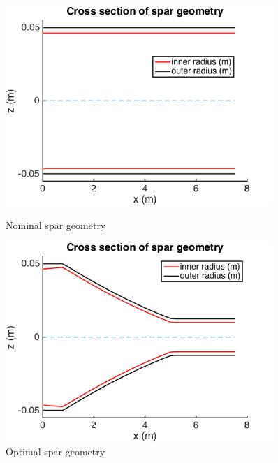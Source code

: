 \documentclass[11pt]{article}
\begin{document}
\begin{figure}[hbt]
\centering
\begin{minipage}[b]{0.4\textwidth}
\includegraphics[width=0.9\textwidth]{nominal_geom}
\caption{Nominal spar geometry}
\label{fig:nominal_geom}
\end{minipage}
\begin{minipage}[b]{0.4\textwidth}
\includegraphics[width=0.9\textwidth]{optimal_geom}
\caption{Optimal spar geometry}
\label{fig:optimal_geom}
\end{minipage}
\end{figure}
\end{document}
